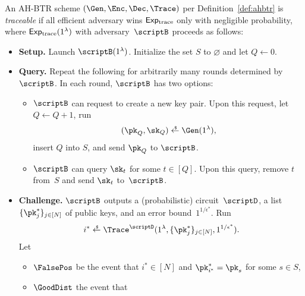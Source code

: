 \begin{definition}[traceability]\label{def:tracing-security}
An AH-BTR scheme $(\Gen,\Enc,\Dec,\Trace)$ per Definition~\ref{def:ahbtr} is \emph{traceable}
if all efficient adversary wins $\ExpTrace$ only with negligible probability,
where $\ExpTrace(1^\lambda)$ with adversary~$\scriptB$ proceeds as follows:
\begin{itemize}\upshape
\item\textbf{Setup.}
Launch $\scriptB(1^\lambda)$.
Initialize the set $S$ to $\varnothing$ and let ${Q\gets 0}$.
\iffalse
Launch $\scriptB(1^\lambda)$ and receive $1^Q$ from it.
Initialize the set $S$ to $[Q]$, run
\begin{align*}
(\pk_q,\sk_q)\draws\Gen(1^\lambda)\qquad\textup{for }q\in[Q],
\end{align*}
and send $\{\pk_q\}_{q\in[Q]}$ to $\scriptB$.
\fi
\item\textbf{Query.}
Repeat the following for arbitrarily many rounds determined by~$\scriptB$.
In each round, $\scriptB$ has two options:
\begin{itemize}
\item $\scriptB$ can request to create a new key pair.
Upon this request, let ${Q\gets Q+1}$, run
\begin{align*}
(\pk_Q,\sk_Q)\draws\Gen(1^\lambda),
\end{align*}
insert $Q$ into $S$, and send $\pk_Q$ to $\scriptB$.
\item $\scriptB$ can query $\sk_t$ for some ${t\in[Q]}$.
Upon this query, remove $t$ from~$S$ and send $\sk_t$ to~$\scriptB$.
\end{itemize}
\iffalse
In each round, $\scriptB$ submits ${t\in[Q]}$ for~$\sk_t$.
\WideNarrow
{Upon the query, remove~$t$~from~$S$~and~send~$\sk_t$~to~$\scriptB$.}
{Upon the query, remove $t$ from the set $S$ and send $\sk_t$ to~$\scriptB$.}
\fi
\item\textbf{Challenge.}
$\scriptB$ outputs a (probabilistic) circuit~$\scriptD$,
a list $\{\pk^\ast_j\}_{j\in[N]}$ of public keys, and
an error bound~$1^{1/\epsilon^\ast}$.
Run
\begin{align*}
i^\ast\draws\Trace^\scriptD(1^\lambda,\{\pk^\ast_j\}_{j\in[N]},1^{1/\epsilon^\ast}).
\end{align*}
Let
\begin{itemize}
\item $\FalsePos$ be the event that ${i^\ast\in[N]}$ and ${\pk^\ast_{i^\ast}=\pk_s}$ for some ${s\in S}$,
\item $\GoodDist$ the event that

\end{itemize}
\end{itemize}
\end{definition}
